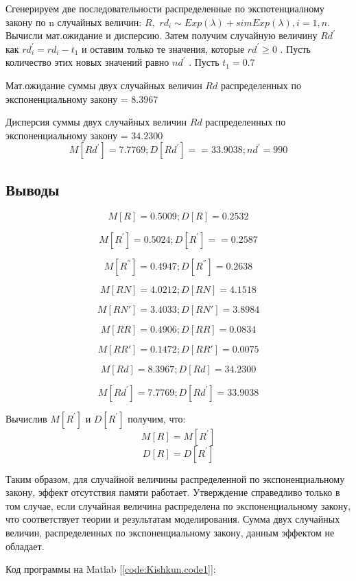 Сгенерируем две последовательности распределенные по
экспотенциалному закону по n случайных величин:  $R,$
$rd_{i}\sim Exp(\lambda)+sim Exp(\lambda),i=1,n$.
Вычисли мат.ожидание и дисперсию. Затем получим случайную величину $Rd^{'}$ как
$rd_{i}^{'}=rd_{i}-t_{1}$ и оставим только те значения, которые $rd^{'}\geq0$ .
Пусть количество этих новых значений равно $nd^{'}$ . Пусть $t_{1}=0.7$

Мат.ожидание суммы двух случайных величин $ Rd $ распределенных по
экспоненциальному закону = $ 8.3967  $

Дисперсия суммы двух случайных величин $ Rd $ распределенных по
экспоненциальному закону = $ 34.2300 $ 
\[ M[Rd^{'}]= 7.7769; D[Rd^{'}]= = 33.9038; nd^{'}= 990 \]
 

\subsection{Выводы}

\[ M[R]= 0.5009; D[R]= 0.2532  \]


\[ M[R^{'}]= 0.5024; D[R^{'}]= = 0.2587 \]


\[ M[R^{''}]= 0.4947; D[R^{''}]= 0.2638 \]


\[ M[RN]= 4.0212; D[RN]=4.1518 \]


\[ M[RN']= 3.4033; D[RN']= 3.8984 \]


\[ M[RR]= 0.4906; D[RR]= 0.0834 \]


\[ M[RR']= 0.1472; D[RR']= 0.0075 \]

\[ M[Rd]= 8.3967; D[Rd]= 34.2300 \]

\[ M[Rd^{'}]= 7.7769; D[Rd^{'}]= 33.9038 \]

Вычислив $M[R^{'}]$ и $D[R^{'}]$ получим, что:
\[ M[R]=M[R^{'}]\]
\[D[R]=D[R^{'}] \]

Таким образом, для случайной величины распределенной по экспоненциальному
закону, эффект отсутствия памяти работает. Утверждение справедливо
только в том случае, если случайная величина распределена по экспоненциальному
закону, что соответствует теории и результатам моделирования. Сумма двух
случайных величин, распределенных по экспоненциальному закону, данным эффектом не
обладает.

Код программы на Matlab [\ref{code:Kishkun.code1}]:

\newpage